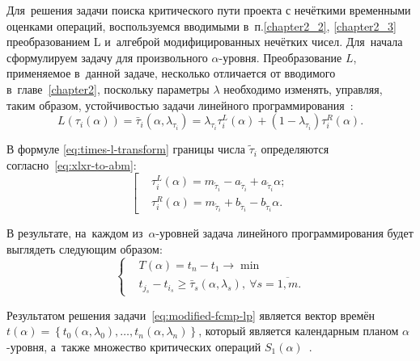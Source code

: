 Для~решения задачи поиска критического пути проекта с нечёткими временными оценками операций, воспользуемся вводимыми в~п.\ref{chapter2_2}, \ref{chapter2_3} преобразованием L и~алгеброй модифицированных нечётких чисел. Для~начала сформулируем задачу для произвольного $\alpha$-уровня. Преобразование $L$, применяемое в~данной задаче, несколько отличается от вводимого в~главе~\ref{chapter2}, поскольку параметры $\lambda$ необходимо изменять, управляя, таким образом, устойчивостью задачи линейного программирования~\cite{Vorontsov_VSTU}:
\begin{equation}
\label{eq:times-l-transform}
  L(\tau_i(\alpha ))=\bar{\tau}_i\left(\alpha, \lambda_{\tau_i}\right)=\lambda_{\tau_i}\tau_{i}^{L}\left(\alpha \right)+(1-\lambda_{\tau_i})\tau_{i}^{R}\left(\alpha \right).
\end{equation}

В формуле \eqref{eq:times-l-transform} границы числа $\tilde \tau_i$ определяются согласно~\eqref{eq:xlxr-to-abm}:
\begin{equation*}
  \left[ \begin{aligned}
    & \tau_{i}^{L}\left(\alpha \right)=m_{\tilde \tau_i}-a_{\tilde \tau_i}+a_{\tilde \tau_i}\alpha; \\ 
    & \tau_{i}^{R}\left(\alpha \right)={{m}_{{{{\tilde{\tau }}}_{i}}}}+{{b}_{{{{\tilde{\tau }}}_{i}}}}-{{b}_{{{{\tilde{\tau }}}_{i}}}}\alpha.
  \end{aligned} \right.
\end{equation*}

В результате, на~каждом из~$\alpha$-уровней задача линейного программирования будет выглядеть следующим образом:
\begin{equation}
\label{eq:modified-fcpm-lp}
  \left\{ \begin{aligned}
    & T(\alpha )=t_n-t_1\to \min  \\ 
    & t_{j_s}-t_{i_s}\geqslant \bar{\tau}_s\left(\alpha,\lambda_s \right),\ \forall s=\overline{1,m}.
  \end{aligned} \right.
\end{equation}

Результатом решения задачи~\eqref{eq:modified-fcmp-lp} является вектор времён $t\left( \alpha \right)=\left\{ t_0\left(\alpha, \lambda_0\right),\ldots,t_n\left(\alpha, \lambda_n\right) \right\}$, который является календарным планом $\alpha$-уровня, а~также множество критических операций $S_1\left( \alpha \right)$~\cite{Vorontsov_VSTU}. 

